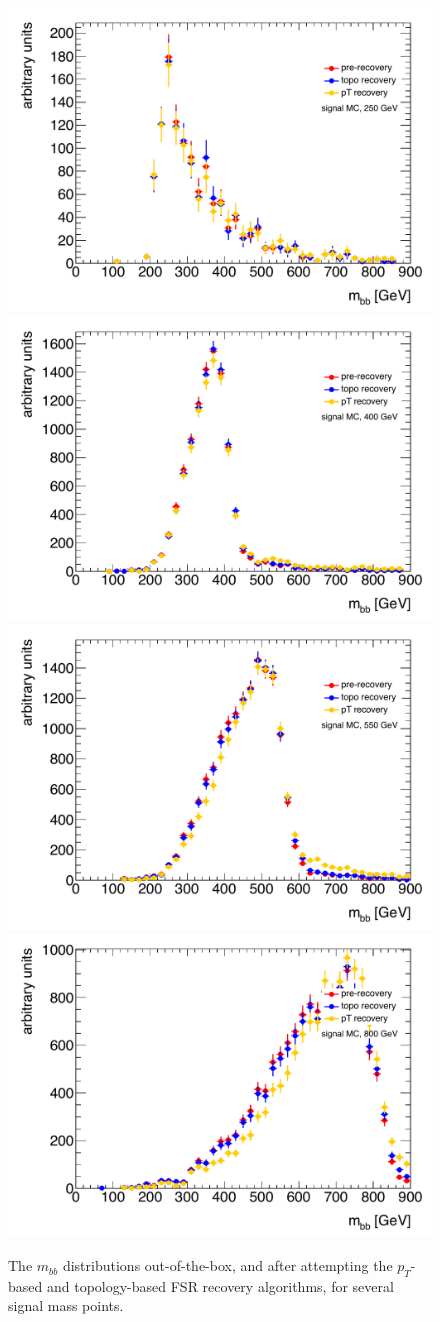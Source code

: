 \begin{figure}[hbt]
  \includegraphics[width=0.45\linewidth]{SignalKin/fsr_recovery_bAbb_250.pdf}
  \includegraphics[width=0.45\linewidth]{SignalKin/fsr_recovery_bAbb_400.pdf}
\newline
  \includegraphics[width=0.45\linewidth]{SignalKin/fsr_recovery_bAbb_550.pdf}
  \includegraphics[width=0.45\linewidth]{SignalKin/fsr_recovery_bAbb_800.pdf}
  \label{fig:fsr_recovery}
  \caption{The $m_{bb}$ distributions out-of-the-box, and after attempting the $p_T$-based and topology-based FSR recovery algorithms, for several signal mass points.}
\end{figure}



